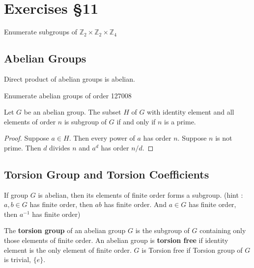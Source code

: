 \section{Exercises \S11}

\begin{question}
	Enumerate subgroups of $\mathbb{Z}_2 \times \mathbb{Z}_2 \times \mathbb{Z}_4$
\end{question}

\subsection{Abelian Groups}
\begin{remark}
Direct product of abelian groups is abelian.%
\end{remark}

\begin{question}
	Enumerate abelian groups of order 127008 
\end{question}

\begin{remark}
	Let $G$ be an abelian group.
	The subset $H$ of $G$ with identity element and all elements of order $n$ is subgroup of $G$ if and only if $n$ is a prime.%
\end{remark}
\begin{proof}
	Suppose $a \in H$.
	Then every power of $a$ has order $n$.
	Suppose $n$ is not prime.
	Then $d$ divides $n$ and $a^d$ has order $n/d$.
\end{proof}

\subsection{Torsion Group and Torsion Coefficients}
\begin{remark}
If group $G$ is abelian, then its elements of finite order forms a subgroup.%
(hint : $a,b \in G$ has finite order, then $ab$ has finite order. And $a \in G$ has finite order, then $a^{-1}$ has finite order)
\end{remark}
\begin{definition} 
	The \textbf{torsion group} of an abelian group $G$ is the subgroup of $G$ containing only those elements of finite order.%
	An abelian group is \textbf{torsion free} if identity element is the only element of finite order.
	$G$ is Torsion free if Torsion group of $G$ is trivial, $\{ e \}$.%
\end{definition}

